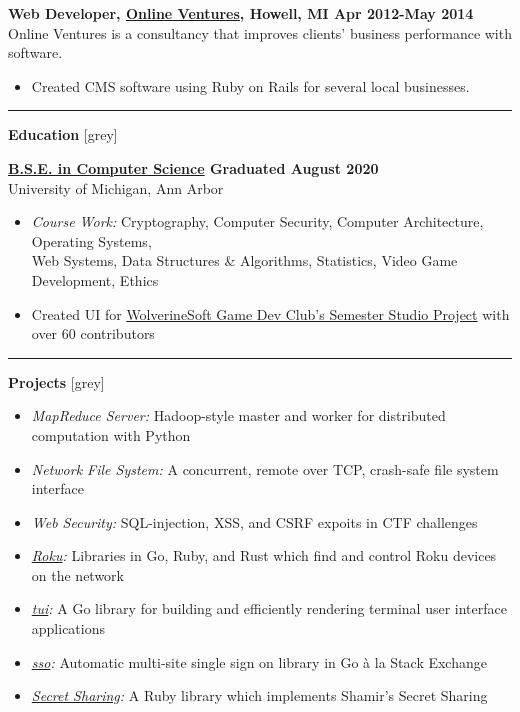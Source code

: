 \documentclass[10pt]{article}
\newcommand{\sectiontitle}[1]{
  {\color{grey}\rule[0.15cm]{0.5cm}{0.5pt}}
  {\Large\textbf{#1}}
  \xrfill[0.1cm]{0.5pt}[grey]
}
\newcommand{\itempad}{\vspace{0.1in}}
\begin{document}
  \itempad

  \textbf{Web Developer, \href{https://www.linkedin.com/company/online-ventures/}{Online Ventures}, Howell, MI \hfill Apr 2012-May 2014}\\
  Online Ventures is a consultancy that improves clients’ business performance with software.
  \vspace{-0.07in}
  \begin{itemize}[leftmargin=1em]
    \setlength\itemsep{-0.3em}
    \item Created CMS software using Ruby on Rails for several local businesses.
  \end{itemize}

  \itempad


  \sectiontitle{Education}
  \itempad

  \textbf{\href{https://ro.umich.edu/graduation/diplomas/degree-verification?dvid=C68OH1JS}{B.S.E. in Computer Science} \hfill  Graduated August 2020} \\
  University of Michigan, Ann Arbor
  \vspace{-0.07in}
  \begin{itemize}[leftmargin=1em]
    \setlength\itemsep{-0.3em}
    \item \textit{Course Work: } Cryptography, Computer Security, Computer Architecture, Operating Systems,\\
      Web Systems, Data Structures \& Algorithms, Statistics, Video Game Development, Ethics
    \item Created UI for \href{https://wolverinesoft-studio.itch.io/io}{WolverineSoft Game Dev Club's Semester Studio Project} with over 60 contributors
  \end{itemize}
  \itempad

  \sectiontitle{Projects}
  \begin{itemize}[leftmargin=1em]
    \setlength\itemsep{-0.3em}
    \item \textit{MapReduce Server:} Hadoop-style master and worker for distributed computation with Python
    \item \textit{Network File System:} A concurrent, remote over TCP, crash-safe file system interface
    \item \textit{Web Security:} SQL-injection, XSS, and CSRF expoits in CTF challenges
    \item \textit{\href{https://github.com/shreve/go-roku}{Roku}:} Libraries in Go, Ruby, and Rust which find and control Roku devices on the network
    \item \textit{\href{https://github.com/shreve/tui}{tui}:} A Go library for building and efficiently rendering terminal user interface applications
    \item \textit{\href{https://github.com/shreve/sso}{sso}:} Automatic multi-site single sign on library in Go \`{a} la Stack Exchange
    \item \textit{\href{https://github.com/shrve/shared-secret}{Secret Sharing}:} A Ruby library which implements Shamir's Secret Sharing
  \end{itemize}
\end{document}
